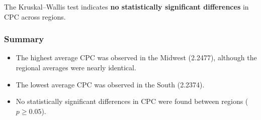 The Kruskal--Wallis test indicates \textbf{no statistically significant differences} in CPC across regions.

\subsubsection{Summary}

\begin{itemize}
	\item The highest average CPC was observed in the Midwest (2.2477), although the regional averages were nearly identical.
	\item The lowest average CPC was observed in the South (2.2374).
	\item No statistically significant differences in CPC were found between regions ($p \geq 0.05$).
\end{itemize}